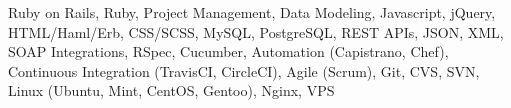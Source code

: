 

\begin{cvparagraph}

Ruby on Rails, Ruby, Project Management, Data Modeling, Javascript, jQuery, HTML/Haml/Erb, CSS/SCSS, MySQL, PostgreSQL, REST APIs, JSON, XML, SOAP Integrations, RSpec, Cucumber, Automation (Capistrano, Chef), Continuous Integration (TravisCI, CircleCI), Agile (Scrum), Git, CVS, SVN, Linux (Ubuntu, Mint, CentOS, Gentoo), Nginx, VPS
\end{cvparagraph}
